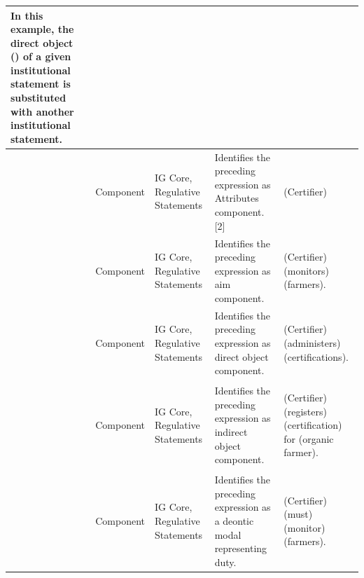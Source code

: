 \begin{longtable}{p{1.5cm} p{2cm} p{2.2cm} p{4cm} p{4.5cm}}
\vspace{0.5cm}
 In this example, the direct object (\Bdir{}) of a given institutional statement is substituted with another institutional statement. \\
\midrule
 \A{} & 
 Component & 
 IG Core, Regulative Statements & 
 Identifies the preceding expression as Attributes component.[2] & \begin{exi}\A{}(Certifier)\end{exi} \\
\midrule
 \I & 
 Component & 
 IG Core, Regulative Statements & 
 Identifies the preceding expression as aim component. & 
 \begin{exi}\A{}(Certifier) \I{}(monitors) \Bdir{}(farmers).\end{exi} \\
\midrule
 \Bdir{} & 
 Component & 
 IG Core, Regulative Statements & 
 Identifies the preceding expression as direct object component. &
 \begin{exi}\A{}(Certifier) \I{}(administers) \Bdir{}(certifications).\end{exi} \\
\midrule
 \Bind{} & 
 Component & 
 IG Core, Regulative Statements & 
 Identifies the preceding expression as indirect object component. &
 \begin{exi}\A{}(Certifier) \I{}(registers) \Bdir{}(certification) for \Bind{}(organic farmer).\end{exi} \\
%
\midrule
 \D{} & 
 Component & 
 IG Core, Regulative Statements &
 Identifies the preceding expression as a deontic modal representing duty. &  
 \begin{exi}\A{}(Certifier) \D{}(must) \I{}(monitor) \Bdir{}(farmers).\end{exi}\\


\end{longtable}
